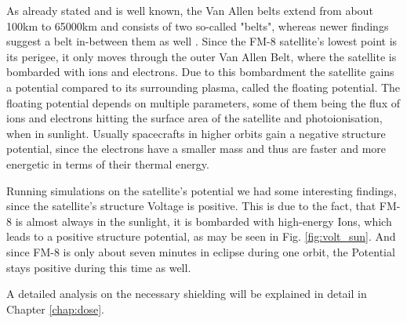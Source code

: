As already stated and is well known, the Van Allen belts extend from about 100km to 65000km and consists of two so-called "belts", whereas newer findings suggest a belt in-between them as well \citep{ESA:clusterWebsite}. Since the FM-8 satellite's lowest point is its perigee, it only moves through the outer Van Allen Belt, where the satellite is bombarded with ions and electrons. 
Due to this bombardment the satellite gains a potential compared to its surrounding plasma, called the floating potential. The floating potential depends on multiple parameters, some of them being the flux of ions and electrons hitting the surface area of the satellite and photoionisation, when in sunlight.
Usually spacecrafts in higher orbits gain a negative structure potential, since the electrons have a smaller mass and thus are faster and more energetic in terms of their thermal energy.

Running simulations on the satellite's potential we had some interesting findings, since the satellite's structure Voltage is positive. This is due to the fact, that FM-8 is almost always in the sunlight, it is bombarded with high-energy Ions, which leads to a positive structure potential, as may be seen in Fig. \ref{fig:volt_sun}. And since FM-8 is only about seven minutes in eclipse during one orbit, the Potential stays positive during this time as well.




A detailed analysis on the necessary shielding will be explained in detail in Chapter \ref{chap:dose}.


